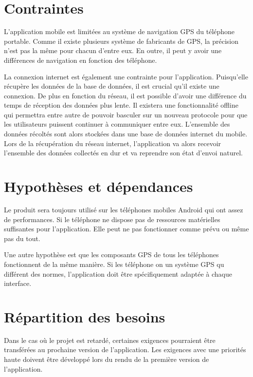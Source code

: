 \documentclass[titlepage, 12pt]{report}
\begin{document}
\section{Contraintes}

L'application mobile est limitées au système de navigation GPS du téléphone portable. Comme il existe plusieurs système de fabricants de GPS, la précision n'est pas la même pour chacun d'entre eux. En outre, il peut y avoir une différences de navigation en fonction des téléphone.

La connexion internet est également une contrainte pour l'application. Puisqu'elle récupère les données de la base de données, il est crucial qu'il existe une connexion. De plus en fonction du réseau, il est possible d'avoir une différence du temps de réception des données plus lente.
Il existera une fonctionnalité offline qui permettra entre autre de pouvoir basculer sur un nouveau protocole pour que les utilisateurs puissent continuer à communiquer entre eux. L'ensemble des données récoltés sont alors stockées dans une base de données internet du mobile. Lors de la récupération du réseau internet, l'application va alors recevoir l'ensemble des données collectés en dur et va reprendre son état d'envoi naturel.

\section{Hypothèses et dépendances}

Le produit sera toujours utilisé sur les téléphones mobiles Android qui ont assez de performances. Si le téléphone ne dispose pas de ressources matérielles suffisantes pour l'application. Elle peut ne pas fonctionner comme prévu ou même pas du tout.

Une autre hypothèse est que les composants GPS de tous les téléphones fonctionnent de la même manière. Si les téléphone on un système GPS qu différent des normes, l'application doit être spécifiquement adaptée à chaque interface.

\section{Répartition des besoins}

Dans le cas où le projet est retardé, certaines exigences pourraient être transférées au prochaine version de l'application. Les exigences avec une priorités haute doivent être développé lors du rendu de la première version de l'application.
\end{document}
